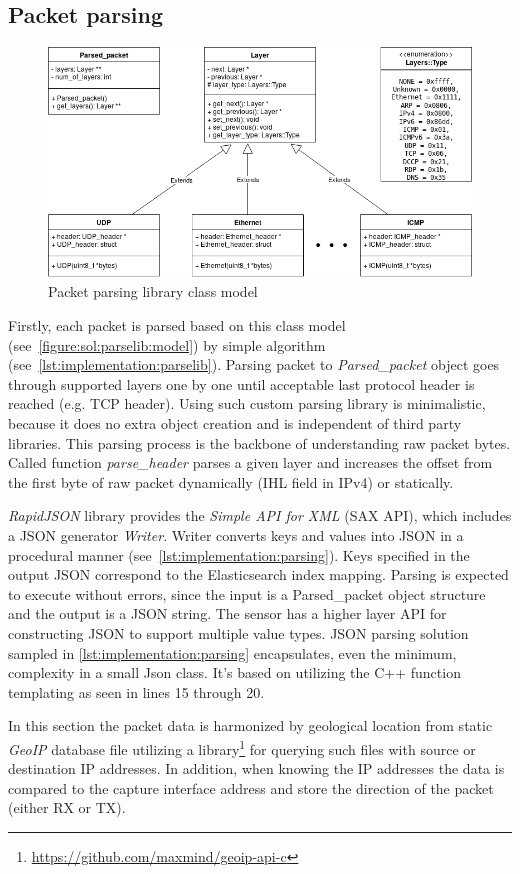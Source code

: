 \documentclass[12pt,a4paper,twoside]{report}
\begin{document}
		\subsection{Packet parsing} \label{implementation:sensor:parse}
			\begin{figure}[h]
				\centering
				\includegraphics[scale=0.5]{parsing}
				\caption{Packet parsing library class model}
				\label{figure:sol:parselib:model}
			\end{figure}
			Firstly, each packet is parsed based on this class model (see~\autoref{figure:sol:parselib:model}) by simple algorithm (see~\autoref{lst:implementation:parselib}). Parsing packet to \emph{Parsed\_packet} object goes through supported layers one by one until acceptable last protocol header is reached (e.g. TCP header). Using such custom parsing library is minimalistic, because it does no extra object creation and is independent of third party libraries. This parsing process is the backbone of understanding raw packet bytes. Called function \emph{parse\_header} parses a given layer and increases the offset from the first byte of raw packet dynamically (IHL field in IPv4) or statically.
			
			
			\emph{RapidJSON} library provides the \emph{Simple API for XML} (SAX API), which includes a JSON generator \emph{Writer}. Writer converts keys and values into JSON in a procedural manner (see~\autoref{lst:implementation:parsing}). Keys specified in the output JSON correspond to the Elasticsearch index mapping. Parsing is expected to execute without errors, since the input is a Parsed\_packet object structure and the output is a JSON string. The sensor has a higher layer API for constructing JSON to support multiple value types. JSON parsing solution sampled in \autoref{lst:implementation:parsing} encapsulates, even the minimum, complexity in a small Json class. It's based on utilizing the C++ function templating as seen in lines 15 through 20.
			
			In this section the packet data is harmonized by geological location from static \emph{GeoIP} database file utilizing a library\footnote{\url{https://github.com/maxmind/geoip-api-c}} for querying such files with source or destination IP addresses. In addition, when knowing the IP addresses the data is compared to the capture interface address and store the direction of the packet (either RX or TX).
\end{document}
